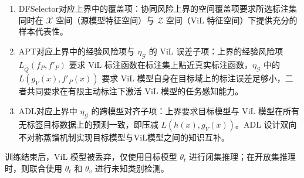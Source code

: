 \begin{enumerate}
    \item DFSelector对应上界中的覆盖项：协同风险上界的空间覆盖项要求所选标注集同时在 $\mathcal{X}$ 空间（源模型特征空间）与 $\mathcal{Z}$ 空间（ViL 特征空间）下提供充分的样本代表性。
    \item APT对应上界中的经验风险项与 $\eta_{\mathcal{G}}$ 的 ViL 误差子项：上界的经验风险项 $L_{\tilde{Q}}(f_P,f'_P)$ 要求 ViL 标注函数在标注集上贴近真实标注函数，$\eta_{\mathcal{G}}$ 中的 $L(g_V(x),f'_P(x))$ 要求 ViL 模型自身在目标域上的标注误差足够小，二者共同要求在有限主动标注下激活 ViL 模型的任务感知能力。
    \item ADL对应上界中 $\eta_{\mathcal{G}}$ 的跨模型对齐子项：上界要求目标模型与 ViL 模型在所有无标签目标数据上的预测一致，即压减 $L(h(x),g_V(x))$。ADL 设计双向不对称蒸馏机制实现目标模型与ViL模型之间的知识互补。
\end{enumerate}


训练结束后，ViL 模型被丢弃，仅使用目标模型 $\theta_t$ 进行闭集推理；在开放集推理时，则联合使用 $\theta_t$ 和 $\theta_v$ 进行未知类别检测。


